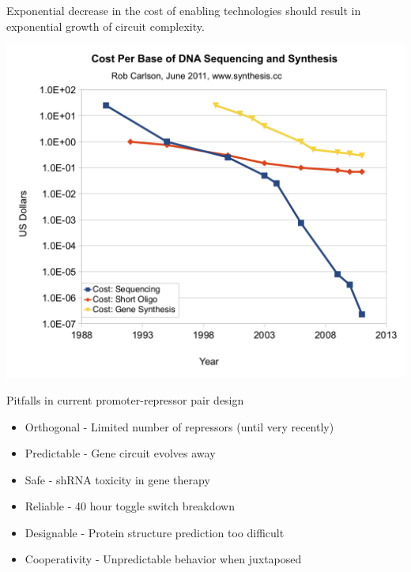 \documentclass{beamer}
\begin{document}
\begin{frame}
Exponential decrease in the cost of enabling technologies should result 
in exponential growth of circuit complexity.


  \includegraphics[scale=0.5]{cost_per_base.png}
  
\end{frame}

\begin{frame}
\begin{block}{Pitfalls in current promoter-repressor pair design}
  \begin{itemize}
    \item Orthogonal  - Limited number of repressors (until very recently)
    \item Predictable - Gene circuit evolves away
    \item Safe        - shRNA toxicity in gene therapy
    \item Reliable    - 40 hour toggle switch breakdown
    \item Designable  - Protein structure prediction too difficult
    \item Cooperativity - Unpredictable behavior when juxtaposed
  \end{itemize}
\end{block}

\end{frame}

\end{document}
